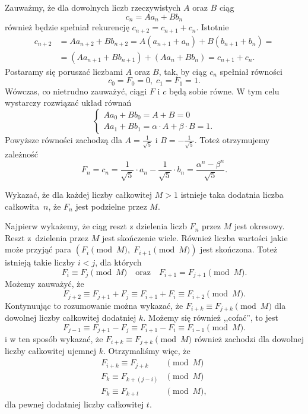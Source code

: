 \vspace{10px}
\noindent
Zauważmy, że dla dowolnych liczb rzeczywistych $A$ oraz $B$ ciąg
\[
	c_n = Aa_n + Bb_n
\]
również będzie spełniał rekurencję $c_{n + 2} = c_{n + 1} + c_n$. Istotnie
\begin{align*}
	c_{n + 2} &= Aa_{n + 2} + Bb_{n + 2} = A(a_{n + 1} + a_n) + B(b_{n + 1} + b_n) = \\
	&= (Aa_{n + 1}  + Bb_{n + 1}) + (Aa_n + Bb_n) = c_{n + 1} + c_n.
\end{align*}
Postaramy się poruszać liczbami $A$ oraz $B$, tak, by ciąg $c_n$ spełniał równości
\[
	c_{0} = F_0 = 0, \; c_{1} = F_1 = 1.
\]
Wówczas, co nietrudno zauważyć, ciągi $F$ i $c$ będą sobie równe. W tym celu wystarczy rozwiązać układ równań
\[
	\begin{cases}
		Aa_0 + Bb_0 = A + B = 0 \\
		Aa_1 + Bb_1 = \alpha \cdot A + \beta \cdot B = 1.
	\end{cases}
\]
Powyższe równości zachodzą dla $A = \frac{1}{\sqrt{5}}$ i $B = -\frac{1}{\sqrt{5}}$. Toteż otrzymujemy zależność
\[
	F_n = c_n = \frac{1}{\sqrt{5}} \cdot a_n - \frac{1}{\sqrt{5}} \cdot b_n = \frac{\alpha^n - \beta^n}{\sqrt{5}}.
\]


\noindent
Wykazać, że dla każdej liczby całkowitej $M > 1$ istnieje taka dodatnia liczba całkowita~$n$, że $F_n$ jest podzielne przez $M$.

\vspace{5px}


\noindent
Najpierw wykażemy, że ciąg reszt z dzielenia liczb $F_n$ przez $M$ jest okresowy. Reszt z~dzielenia przez $M$ jest skończenie wiele. Również liczba wartości jakie może przyjąć para $(F_i \pmod{M},\; F_{i + 1}\pmod{M})$ jest skończona. Toteż istnieją takie liczby $i < j$, dla których
\[
	F_i \equiv F_j \pmod{M} \quad \text{oraz} \quad F_{i + 1} = F_{j + 1} \pmod{M}.
\]
Możemy zauważyć, że
\[
	F_{j + 2} \equiv F_{j + 1} + F_j \equiv F_{i + 1} + F_i \equiv F_{i + 2} \pmod{M}.
\]
Kontynuując to rozumowanie można wykazać, że $F_{i + k} \equiv F_{j + k} \pmod{M}$ dla dowolnej liczby całkowitej dodatniej $k$.
Możemy się również ,,cofać'', to jest
\[
	F_{j - 1} \equiv F_{j + 1} - F_j \equiv F_{i + 1} - F_i \equiv F_{i - 1} \pmod{M}.
\]
i w ten sposób wykazać, że $F_{i + k} \equiv F_{j + k} \pmod{M}$ również zachodzi dla dowolnej liczby całkowitej ujemnej $k$. Otrzymaliśmy więc, że
\begin{align*}
	F_{i + k} \equiv F_{j + k} &\pmod{M}\\
	F_{k} \equiv F_{k + (j - i)} &\pmod{M} \\
	F_{k} \equiv F_{k + t} &\pmod{M},
\end{align*}
dla pewnej dodatniej liczby całkowitej $t$.

